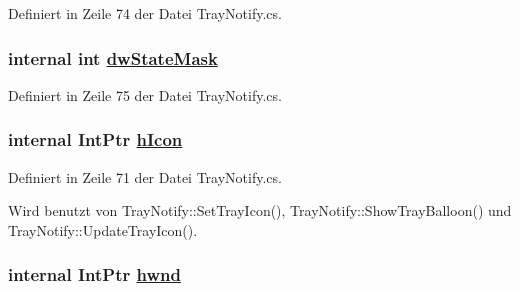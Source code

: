 Definiert in Zeile 74 der Datei Tray\-Notify.cs.\hypertarget{structQbeTray_1_1TrayNotify_1_1NOTIFYICONDATA_QbeTray_1_1TrayNotify_1_1NOTIFYICONDATAo8}{
\subsubsection[dwStateMask]{\setlength{\rightskip}{0pt plus 5cm}internal int \hyperlink{structQbeTray_1_1TrayNotify_1_1NOTIFYICONDATA_QbeTray_1_1TrayNotify_1_1NOTIFYICONDATAo8}{dw\-State\-Mask}}}
\label{structQbeTray_1_1TrayNotify_1_1NOTIFYICONDATA_QbeTray_1_1TrayNotify_1_1NOTIFYICONDATAo8}




Definiert in Zeile 75 der Datei Tray\-Notify.cs.\hypertarget{structQbeTray_1_1TrayNotify_1_1NOTIFYICONDATA_QbeTray_1_1TrayNotify_1_1NOTIFYICONDATAo5}{
\subsubsection[hIcon]{\setlength{\rightskip}{0pt plus 5cm}internal Int\-Ptr \hyperlink{structQbeTray_1_1TrayNotify_1_1NOTIFYICONDATA_QbeTray_1_1TrayNotify_1_1NOTIFYICONDATAo5}{h\-Icon}}}
\label{structQbeTray_1_1TrayNotify_1_1NOTIFYICONDATA_QbeTray_1_1TrayNotify_1_1NOTIFYICONDATAo5}




Definiert in Zeile 71 der Datei Tray\-Notify.cs.

Wird benutzt von Tray\-Notify::Set\-Tray\-Icon(), Tray\-Notify::Show\-Tray\-Balloon() und Tray\-Notify::Update\-Tray\-Icon().\hypertarget{structQbeTray_1_1TrayNotify_1_1NOTIFYICONDATA_QbeTray_1_1TrayNotify_1_1NOTIFYICONDATAo1}{
\subsubsection[hwnd]{\setlength{\rightskip}{0pt plus 5cm}internal Int\-Ptr \hyperlink{structQbeTray_1_1TrayNotify_1_1NOTIFYICONDATA_QbeTray_1_1TrayNotify_1_1NOTIFYICONDATAo1}{hwnd}}}
\label{structQbeTray_1_1TrayNotify_1_1NOTIFYICONDATA_QbeTray_1_1TrayNotify_1_1NOTIFYICONDATAo1}





